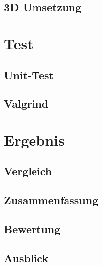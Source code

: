 \documentclass[a4paper]{scrartcl}
\begin{document}
\subsection{3D Umsetzung}\label{ch:3DUmsetzung}

\section{Test}\label{ch:Test}
\subsection{Unit-Test}\label{ch:Unit}

\subsection{Valgrind}\label{ch:Valgrind}

\section{Ergebnis}\label{ch:Ergebnis}

\subsection{Vergleich}\label{ch:Vergleich}
\subsection{Zusammenfassung}\label{ch:Zusammenfassung}
\subsection{Bewertung}\label{ch:Bewertung}
\subsection{Ausblick}\label{ch:Ausblick}

\newpage
\end{document}
